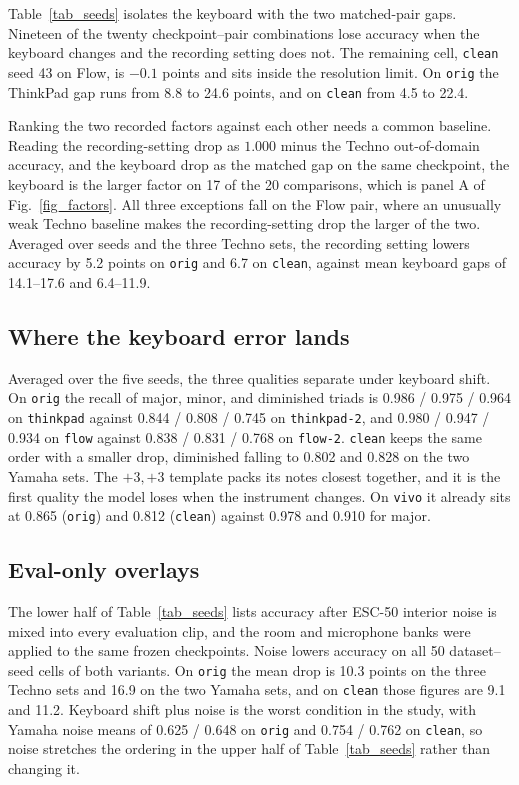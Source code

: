 \documentclass[pdflatex,sn-mathphys-num,iicol]{sn-jnl}
\begin{document}
Table~\ref{tab_seeds} isolates the keyboard with the two matched-pair gaps. Nineteen of the twenty checkpoint--pair combinations lose accuracy when the keyboard changes and the recording setting does not. The remaining cell, \texttt{clean} seed 43 on Flow, is $-0.1$ points and sits inside the resolution limit. On \texttt{orig} the ThinkPad gap runs from 8.8 to 24.6 points, and on \texttt{clean} from 4.5 to 22.4.

Ranking the two recorded factors against each other needs a common baseline. Reading the recording-setting drop as $1.000$ minus the Techno out-of-domain accuracy, and the keyboard drop as the matched gap on the same checkpoint, the keyboard is the larger factor on 17 of the 20 comparisons, which is panel A of Fig.~\ref{fig_factors}. All three exceptions fall on the Flow pair, where an unusually weak Techno baseline makes the recording-setting drop the larger of the two. Averaged over seeds and the three Techno sets, the recording setting lowers accuracy by 5.2 points on \texttt{orig} and 6.7 on \texttt{clean}, against mean keyboard gaps of 14.1--17.6 and 6.4--11.9.

\subsection{Where the keyboard error lands}\label{subsec_res_quality}

Averaged over the five seeds, the three qualities separate under keyboard shift. On \texttt{orig} the recall of major, minor, and diminished triads is 0.986 / 0.975 / 0.964 on \texttt{thinkpad} against 0.844 / 0.808 / 0.745 on \texttt{thinkpad-2}, and 0.980 / 0.947 / 0.934 on \texttt{flow} against 0.838 / 0.831 / 0.768 on \texttt{flow-2}. \texttt{clean} keeps the same order with a smaller drop, diminished falling to 0.802 and 0.828 on the two Yamaha sets. The $+3,+3$ template packs its notes closest together, and it is the first quality the model loses when the instrument changes. On \texttt{vivo} it already sits at 0.865 (\texttt{orig}) and 0.812 (\texttt{clean}) against 0.978 and 0.910 for major.

\subsection{Eval-only overlays}\label{subsec_res_noise}

The lower half of Table~\ref{tab_seeds} lists accuracy after ESC-50 interior noise is mixed into every evaluation clip, and the room and microphone banks were applied to the same frozen checkpoints. Noise lowers accuracy on all 50 dataset--seed cells of both variants. On \texttt{orig} the mean drop is 10.3 points on the three Techno sets and 16.9 on the two Yamaha sets, and on \texttt{clean} those figures are 9.1 and 11.2. Keyboard shift plus noise is the worst condition in the study, with Yamaha noise means of 0.625 / 0.648 on \texttt{orig} and 0.754 / 0.762 on \texttt{clean}, so noise stretches the ordering in the upper half of Table~\ref{tab_seeds} rather than changing it.
\end{document}

